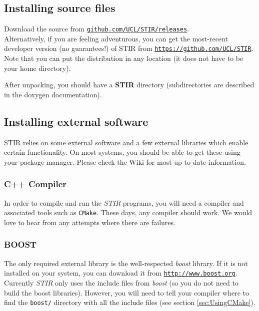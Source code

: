 \documentclass{article}
\def\url#1#2{\mbox{\href{#1}{\tt #2}}}
\begin{document}
\subsection{
Installing source files}

Download the source from \url{https://github.com/UCL/STIR/releases}{github.com/UCL/STIR/releases}.\\
Alternatively, if you are feeling adventurous, you can get the most-recent
developer version (no guarantees!) of STIR from
\url{https://github.com/UCL/STIR}{https://github.com/UCL/STIR}.\\

Note that you can put the distribution in any location (it does 
not have to be your home directory).


After unpacking, you should have a \textbf{STIR} directory (subdirectories are described 
in the doxygen documentation).

\subsection{
Installing external software}
STIR relies on some external software and a few external libraries which enable certain functionality. 
On most systems, you should be able to get these using your package manager. 
Please check the Wiki for most up-to-date information.

\subsubsection{
C++ Compiler}

In order to compile and run the \textit{STIR} programs, you will need a compiler
and associated tools such as \texttt{CMake}. These days, any compiler should work. We would love 
to hear from any attempts where there are failures.

\subsubsection{BOOST}
The only required external library is the well-respected \textit{boost} library. If it
is not installed on your system, you can download it from 
\url{http://www.boost.org}{http://www.boost.org}. Currently \textit{STIR} only
uses the include files from \textit{boost} (so you do not need to build
the boost libraries). However, you will need to tell your compiler
where to find the \texttt{boost/} directory with all the include files
(see section \ref{sec:UsingCMake}).
\end{document}
